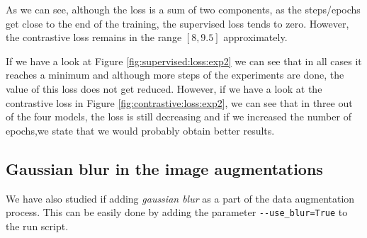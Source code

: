 As we can see, although the loss is a sum of two components, as the steps/epochs get close to the end of the training, the supervised loss tends to zero. However, the contrastive loss remains in the range $[8,9.5]$ approximately. 

If we have a look at Figure \ref{fig:supervised:loss:exp2} we can see that in all cases it reaches a minimum and although more steps of the experiments are done, the value of this loss does not get reduced. However, if we have a look at the contrastive loss in Figure \ref{fig:contrastive:loss:exp2}, we can see that in three out of the four models, the loss is still decreasing and if we increased the number of epochs,we state that we would probably obtain better results.

\subsection{Gaussian blur in the image augmentations}

We have also studied if adding \emph{gaussian blur} as a part of the data augmentation process. This can be easily done by adding the parameter \lstinline{--use_blur=True} to the run script.